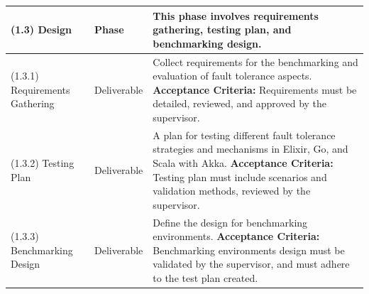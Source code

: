 \begin{longtable}{|p{3cm}|p{2.5cm}|p{8cm}|}
    (1.3) Design                   & Phase                 & This phase involves requirements gathering, testing plan, and benchmarking design.                                                                                                                                                                                                                                                                        \\ \hline
    (1.3.1) Requirements Gathering & Deliverable           & Collect requirements for the benchmarking and evaluation of fault tolerance aspects. \newline \textbf{Acceptance Criteria:} Requirements must be detailed, reviewed, and approved by the supervisor.                                                                                                                                                      \\ \hline
    (1.3.2) Testing Plan           & Deliverable           & A plan for testing different fault tolerance strategies and mechanisms in Elixir, Go, and Scala with Akka. \newline \textbf{Acceptance Criteria:} Testing plan must include scenarios and validation methods, reviewed by the supervisor.                                                                                                                 \\ \hline
    (1.3.3) Benchmarking Design    & Deliverable           & Define the design for benchmarking environments. \newline \textbf{Acceptance Criteria:} Benchmarking environments design must be validated by the supervisor, and must adhere to the test plan created.                                                                                                                                                   \\ \hline
    \hline %


\end{longtable}
